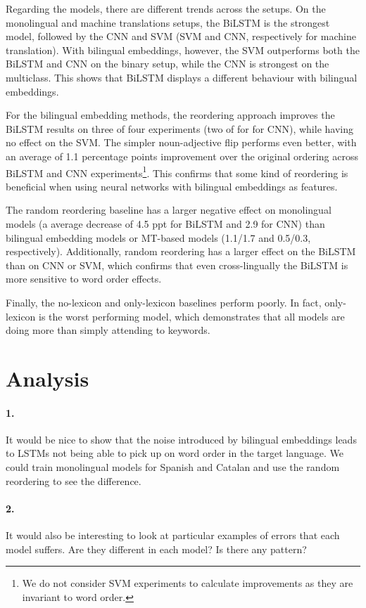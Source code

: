 \documentclass[11pt,a4paper]{article}
\begin{document}
Regarding the models, there are different trends across the setups. On the monolingual and machine translations setups, the BiLSTM is the strongest model, followed by the CNN and SVM (SVM and CNN, respectively for machine translation). With bilingual embeddings, however, the SVM outperforms both the BiLSTM and CNN on the binary setup, while the CNN is strongest on the multiclass. This shows that BiLSTM displays a different behaviour with bilingual embeddings.

For the bilingual embedding methods, the reordering approach improves the BiLSTM results on three of four experiments (two of for for CNN), while having no effect on the SVM. The simpler noun-adjective flip performs even better, with an average of 1.1 percentage points improvement over the original ordering across BiLSTM and CNN experiments\footnote{We do not consider SVM experiments to calculate improvements as they are invariant to word order.}. This confirms that some kind of reordering is beneficial when using neural networks with bilingual embeddings as features.

The random reordering baseline has a larger negative effect on monolingual models (a average decrease of 4.5 ppt for BiLSTM and 2.9 for CNN) than bilingual embedding models or MT-based models (1.1/1.7 and 0.5/0.3, respectively). Additionally, random reordering has a larger effect on the BiLSTM than on CNN or SVM, which confirms that even cross-lingually the BiLSTM is more sensitive to word order effects.

Finally, the no-lexicon and only-lexicon baselines perform poorly. In fact, only-lexicon is the worst performing model, which demonstrates that all models are doing more than simply attending to keywords.



\section{Analysis}

\paragraph{1. }It would be nice to show that 
the noise introduced by bilingual 
embeddings leads to LSTMs not 
being able to pick up on word 
order in the target language.
We could train monolingual models 
for Spanish and Catalan and use the 
random reordering to see the 
difference.

\paragraph{2. }It would also be interesting 
to look at particular examples 
of errors that each model suffers.
Are they different in each model?
Is there any pattern?
\end{document}
